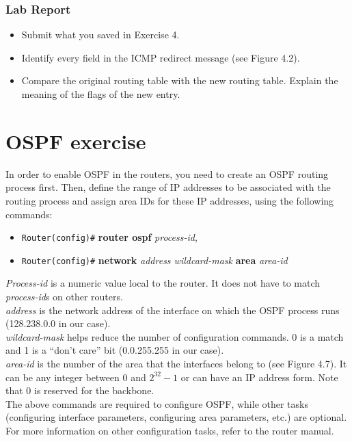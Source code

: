 \documentclass[10pt,a4paper]{article}
\numberwithin{equation}{section}
\numberwithin{figure}{section}
\numberwithin{table}{section}
\begin{document}
    \subsubsection*{Lab Report}
    \begin{itemize}
        \setlength{\itemindent}{0pt}
        \item Submit what you saved in Exercise 4.
        \item Identify every field in the ICMP redirect message (see Figure 4.2).
        \item Compare the original routing table with the new routing table. Explain the meaning of the flags of the new entry.
    \end{itemize}


\section*{OSPF exercise}
    In order to enable OSPF in the routers, you need to create an OSPF routing process first.
    Then, define the range of IP addresses to be associated with the routing process and assign area IDs for these IP addresses, using the following commands:
    \begin{itemize}
        \item [] \texttt{Router(config)\#} \textbf{router ospf} \textit{process-id},
        \item [] \texttt{Router(config)\#} \textbf{network} \textit{address wildcard-mask} \textbf{area} \textit{area-id}
    \end{itemize}
    \textit{Process-id} is a numeric value local to the router.
    It does not have to match \textit{process-id}s on other routers.\\
    \textit{address} is the network address of the interface on which the OSPF process runs (128.238.0.0 in our case).\\
    \textit{wildcard-mask} helps reduce the number of configuration commands.
    0 is a match and 1 is a “don’t care” bit (0.0.255.255 in our case).\\
    \textit{area-id} is the number of the area that the interfaces belong to (see Figure 4.7).
    It can be any integer between 0 and $2^{32} - 1$ or can have an IP address form.
    Note that 0 is reserved for the backbone. \\
    The above commands are required to configure OSPF, while other tasks (configuring interface parameters, configuring area parameters, etc.) are optional.
    For more information on other configuration tasks, refer to the router manual. \\
\end{document}
